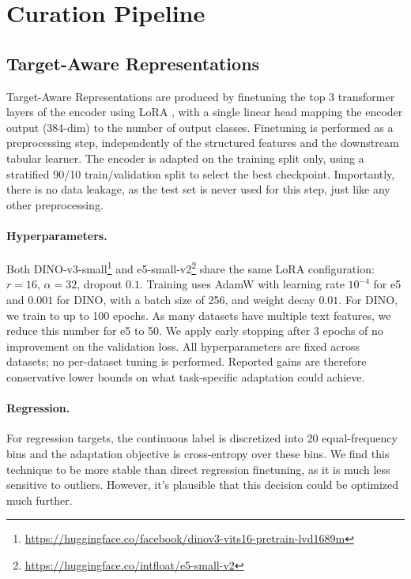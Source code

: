 \clearpage
\appendix

\section{Curation Pipeline}
\label{app:curation}

\subsection{Target-Aware Representations}
\label{app:curation_tar_training}

Target-Aware Representations are produced by finetuning the top 3 transformer layers of the encoder using LoRA \cite{hu_lora_2021}, with a single linear head mapping the encoder output (384-dim) to the number of output classes. Finetuning is performed as a preprocessing step, independently of the structured features and the downstream tabular learner. The encoder is adapted on the training split only, using a stratified 90/10 train/validation split to select the best checkpoint. Importantly, there is no data leakage, as the test set is never used for this step, just like any other preprocessing.


\paragraph{Hyperparameters.} Both DINO-v3-small\footnote{\url{https://huggingface.co/facebook/dinov3-vits16-pretrain-lvd1689m}} and e5-small-v2\footnote{\url{https://huggingface.co/intfloat/e5-small-v2}} share the same LoRA configuration: $r=16$, $\alpha=32$, dropout $0.1$. Training uses AdamW with learning rate $10^{-4}$ for e5 and $0.001$ for DINO, with a batch size of 256, and weight decay $0.01$. For DINO, we train to up to 100 epochs. As many datasets have multiple text features, we reduce this number for e5 to 50. We apply early stopping after 3 epochs of no improvement on the validation loss. All hyperparameters are fixed across datasets; no per-dataset tuning is performed. Reported gains are therefore conservative lower bounds on what task-specific adaptation could achieve.

\paragraph{Regression.} For regression targets, the continuous label is discretized into 20 equal-frequency bins and the adaptation objective is cross-entropy over these bins. We find this technique to be more stable than direct regression finetuning, as it is much less sensitive to outliers. However, it's plausible that this decision could be optimized much further.

